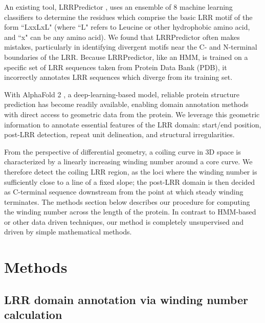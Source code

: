\documentclass[authoryear]{article}
\begin{document}
An existing tool, LRRPredictor \cite{martin2020lrrpredictor}, uses an ensemble of 8 machine learning classifiers to determine the residues which comprise the basic LRR motif of the form ``LxxLxL" (where ``L" refers to Leucine or other hydrophobic amino acid, and ``x" can be any amino acid). We found that LRRPredictor often makes mistakes, particularly in identifying divergent motifs near the C- and N-terminal boundaries of the LRR. Because LRRPredictor, like an HMM, is trained on a specific set of LRR sequences taken from Protein Data Bank \cite{berman2000protein} (PDB), it incorrectly annotates LRR sequences which diverge from its training set.


With AlphaFold 2 \cite{jumper2021highly}, a deep-learning-based model, reliable protein structure prediction has become readily available, enabling domain annotation methods with direct access to geometric data from the protein. We leverage this geometric information to annotate essential features of the LRR domain: start/end position, post-LRR detection, repeat unit delineation, and structural irregularities.

From the perspective of differential geometry, a coiling curve in 3D space is characterized by a linearly increasing winding number around a core curve. We therefore detect the coiling LRR region, as the loci where the winding number is sufficiently close to a line of a fixed slope; the post-LRR domain is then decided as C-terminal sequence downstream from the point at which steady winding terminates. The methods section below describes our procedure for computing the winding number across the length of the protein. In contrast to HMM-based or other data driven techniques, our method is completely unsupervised and driven by simple mathematical methods.

\section*{Methods}

\subsection*{LRR domain annotation via winding number calculation }
\end{document}
